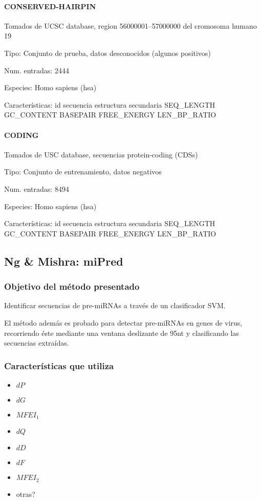 \documentclass[12pt,bibliography=openstyle,DIV=12,parskip=half-]{scrartcl}
\begin{document}
\paragraph{CONSERVED-HAIRPIN}
Tomados de UCSC database, region 56000001--57000000 del cromosoma
humano 19
\begin{description*}
\item[Tipo:] Conjunto de prueba, datos desconocidos (algunos
  positivos)
\item[Num. entradas:] 2444
\item[Especies:]  Homo sapiens (hsa)
\item[Características:]
id \quad
secuencia \quad
estructura secundaria \quad
SEQ\_LENGTH \quad
GC\_CONTENT \quad
BASEPAIR \quad
FREE\_ENERGY \quad
LEN\_BP\_RATIO
\end{description*}
\paragraph{CODING}
Tomados de USC database, secuencias protein-coding (CDSs)
\begin{description*}
\item[Tipo:] Conjunto de entrenamiento, datos negativos
\item[Num. entradas:] 8494
\item[Especies:]  Homo sapiens (hsa)
\item[Características:]
id \quad
secuencia \quad
estructura secundaria \quad
SEQ\_LENGTH \quad
GC\_CONTENT \quad
BASEPAIR \quad
FREE\_ENERGY \quad
LEN\_BP\_RATIO
\end{description*}
%
%
%
%
%
\subsection{Ng \& Mishra: miPred}
\subsubsection{Objetivo del método presentado}
Identificar secuencias de pre-miRNAs a través de un clasificador SVM.

El método además es probado para detectar pre-miRNAs en genes de
virus, recorriendo éste mediante una ventana deslizante de 95nt y
clasificando las secuencias extraídas.
\subsubsection{Características que utiliza}
\begin{itemize}
\item $dP$
\item $dG$
\item $MFEI_1$
\item $dQ$
\item $dD$
\item $dF$
\item $MFEI_2$
\item otras?
\end{itemize}
\end{document}
